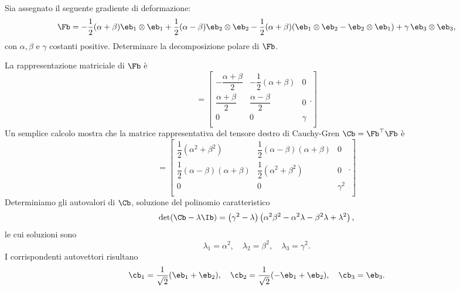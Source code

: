 \begin{exercise}
Sia assegnato il seguente gradiente di deformazione:
\begin{equation}
\Fb=-\frac{1}{2}(\alpha+\beta)\eb_1\otimes\eb_1+\frac{1}{2}(\alpha-\beta)\eb_2\otimes\eb_2-\frac12 (\alpha+\beta)(\eb_1\otimes\eb_2-\eb_2\otimes\eb_1)+\gamma \,\eb_3\otimes\eb_3,
\end{equation}
con $\alpha,\beta$ e $\gamma$ costanti positive. Determinare la decomposizione polare di  $\Fb$.
\begin{svolgimento}
La rappresentazione matriciale di $\Fb$ è 
\begin{equation}
[\Fb]=	\left[
\begin{array}{ccc}
	-\dfrac{ \alpha+\beta }{2} & -\dfrac{1}{2} (\alpha +\beta ) & 0 \\ [.2cm]
	\dfrac{\alpha +\beta }{2} & \dfrac{\alpha -\beta }{2} & 0 \\[.2cm]
	0 & 0 & \gamma  \\
\end{array}.
\right]
\end{equation}
Un semplice calcolo mostra che la matrice rappresentativa del tensore destro di Cauchy-Gren $\Cb=\Fb^\top\Fb$ è
\begin{equation}
[\Cb]=\left[
\begin{array}{ccc}
	\dfrac{1}{2} \left(\alpha ^2+\beta ^2\right) & \dfrac{1}{2} (\alpha -\beta ) (\alpha
	+\beta ) & 0 \\[.2cm]
	\dfrac{1}{2} (\alpha -\beta ) (\alpha +\beta ) & \dfrac{1}{2} \left(\alpha ^2+\beta
	^2\right) & 0 \\[.2cm]
	0 & 0 & \gamma ^2 \\
\end{array}.
\right]
\end{equation}
Determiniamo gli autovalori di $\Cb$, soluzione del polinomio caratteristico
\begin{equation}
	\det(\Cb-\lambda \Ib)=\left(\gamma ^2-\lambda \right) \left(\alpha ^2 \beta ^2-\alpha ^2 \lambda -\beta ^2
	\lambda +\lambda ^2\right),
\end{equation}
le cui soluzioni sono
\begin{equation}
\lambda_1=\alpha^2, \quad \lambda_2=\beta^2, \quad \lambda_3=\gamma^2.
\end{equation}
I corrispondenti autovettori risultano
\begin{equation}
\cb_1=\frac{1}{\sqrt{2}}(\eb_1+\eb_2), \quad \cb_2=\frac{1}{\sqrt{2}}(-\eb_1+\eb_2), \quad \cb_3=\eb_3.
\end{equation}

\end{svolgimento}
\end{exercise}
